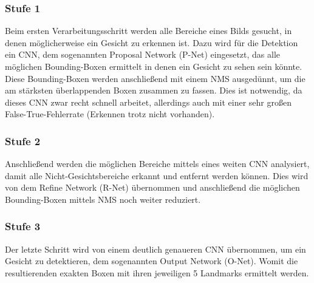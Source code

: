 \subsubsection{Stufe 1}
Beim ersten Verarbeitungsschritt werden alle Bereiche eines Bilds gesucht, in denen möglicherweise ein Gesicht zu erkennen ist. Dazu wird für die Detektion ein CNN, dem sogenannten Proposal Network (P-Net) eingesetzt, das alle möglichen Bounding-Boxen ermittelt in denen ein Gesicht zu sehen sein könnte. Diese Bounding-Boxen werden anschließend mit einem NMS ausgedünnt, um die am stärksten überlappenden Boxen zusammen zu fassen. Dies ist notwendig, da dieses CNN zwar recht schnell arbeitet, allerdings auch mit einer sehr großen False-True-Fehlerrate (Erkennen trotz nicht vorhanden).
\subsubsection{Stufe 2}
Anschließend werden die möglichen Bereiche mittels eines weiten CNN analysiert, damit alle Nicht-Gesichtsbereiche erkannt und entfernt werden können. Dies wird von dem Refine Network (R-Net) übernommen und anschließend die möglichen Bounding-Boxen mittels NMS noch weiter reduziert.
\subsubsection{Stufe 3}
Der letzte Schritt wird von einem deutlich genaueren CNN übernommen, um ein Gesicht zu detektieren, dem sogenannten Output Network (O-Net). Womit die resultierenden exakten Boxen mit ihren jeweiligen 5 Landmarks ermittelt werden.
